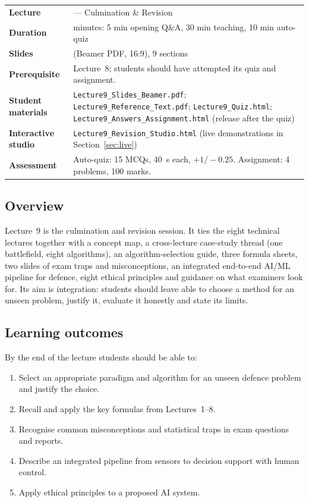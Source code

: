 \documentclass[11pt]{article}
\begin{document}
\begin{center}\small\renewcommand{\arraystretch}{1.25}\begin{tabularx}{\textwidth}{@{}>{\bfseries}p{3.3cm}>{\raggedright\arraybackslash}X@{}}\toprule

\textcolor{NavyN}{Lecture}&9 --- Culmination \& Revision\\
\textcolor{NavyN}{Duration}&45 minutes: 5 min opening Q\&A, 30 min teaching, 10 min auto-quiz\\
\textcolor{NavyN}{Slides}&14 (Beamer PDF, 16:9), 9 sections\\
\textcolor{NavyN}{Prerequisite}&Lecture~8; students should have attempted its quiz and assignment.\\
\textcolor{NavyN}{Student materials}&\texttt{Lecture9\_Slides\_Beamer.pdf}; \texttt{Lecture9\_Reference\_Text.pdf}; \texttt{Lecture9\_Quiz.html}; \texttt{Lecture9\_Answers\_Assignment.html} (release after the quiz)\\
\textcolor{NavyN}{Interactive studio}&\texttt{Lecture9\_Revision\_Studio.html} (live demonstrations in Section~\ref{sec:live})\\
\textcolor{NavyN}{Assessment}&Auto-quiz: 15 MCQs, 40~s each, $+1/-0.25$. Assignment: 4 problems, 100 marks.\\\bottomrule\end{tabularx}\end{center}

\subsection*{Overview}Lecture~9 is the culmination and revision session. It ties the eight technical lectures together with a concept map, a cross-lecture case-study thread (one battlefield, eight algorithms), an algorithm-selection guide, three formula sheets, two slides of exam traps and misconceptions, an integrated end-to-end AI/ML pipeline for defence, eight ethical principles and guidance on what examiners look for. Its aim is integration: students should leave able to choose a method for an unseen problem, justify it, evaluate it honestly and state its limits.

\subsection*{Learning outcomes}By the end of the lecture students should be able to:\begin{enumerate}\item Select an appropriate paradigm and algorithm for an unseen defence problem and justify the choice.\item Recall and apply the key formulas from Lectures~1--8.\item Recognise common misconceptions and statistical traps in exam questions and reports.\item Describe an integrated pipeline from sensors to decision support with human control.\item Apply ethical principles to a proposed AI system.\end{enumerate}
\end{document}
